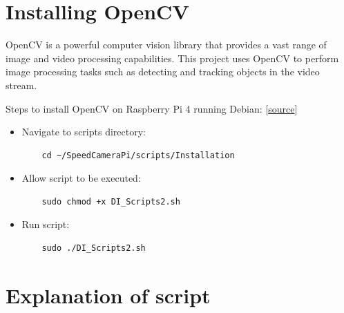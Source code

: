 \section{Installing OpenCV}

OpenCV is a powerful computer vision library that provides a vast range of image and video processing capabilities. This project uses OpenCV to perform image processing tasks such as detecting and tracking objects in the video stream.

Steps to install OpenCV on Raspberry Pi 4 running Debian: [\href{https://qengineering.eu/install-opencv-4.5-on-raspberry-pi-4.html}{source}]

\begin{itemize}
      \item Navigate to scripts directory:

            \begin{lstlisting}
    cd ~/SpeedCameraPi/scripts/Installation
    \end{lstlisting}

      \item Allow script to be executed:

            \begin{lstlisting}
    sudo chmod +x DI_Scripts2.sh
    \end{lstlisting}

      \item Run script:

            \begin{lstlisting}
    sudo ./DI_Scripts2.sh
    \end{lstlisting}
\end{itemize}

\section{Explanation of script}

